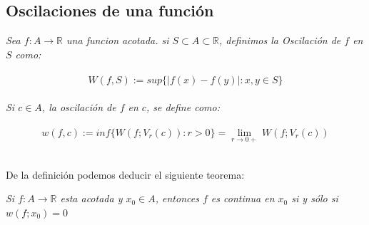 \documentclass[11pt,letterpaper]{article}
\newcommand{\R}{\mathbb{R}}
\begin{document}
\subsection*{Oscilaciones de una funci\'on}
\begin{tcolorbox}[
	title = \textcolor{black}{\textcolor{white}{Definici\'on 2}},]
\textit{Sea $f:A\rightarrow \R$ una funcion acotada. si $S\subset A\subset \R$, definimos la Oscilaci\'on de 
$f$ en $S$ como:\,\\
\,\\
\begin{equation*}
        W(f,S):=sup\{|f(x)-f(y)|:x,y\in S\}
\end{equation*}\,\\
Si $c\in A$, la oscilaci\'on de $f$ en $c$, se define como:\,\\
\,\\
\begin{equation*}
    w(f,c):=inf\{W(f;V_r(c)):r>0\}=\lim_{r\rightarrow 0+}\,W(f;V_r(c))
\end{equation*}}
\end{tcolorbox}
\newpage
\,\\
De la definici\'on podemos deducir el siguiente teorema:
\begin{tcolorbox}[
	title = \textcolor{black}{\textcolor{white}{Teorema 3}},]
\textit{Si $f:A\rightarrow\R$ esta acotada y $x_0\in A$, entonces $f$ es continua en $x_0$ si y s\'olo si $w(f;x_0)=0$}
\end{tcolorbox}
\end{document}
